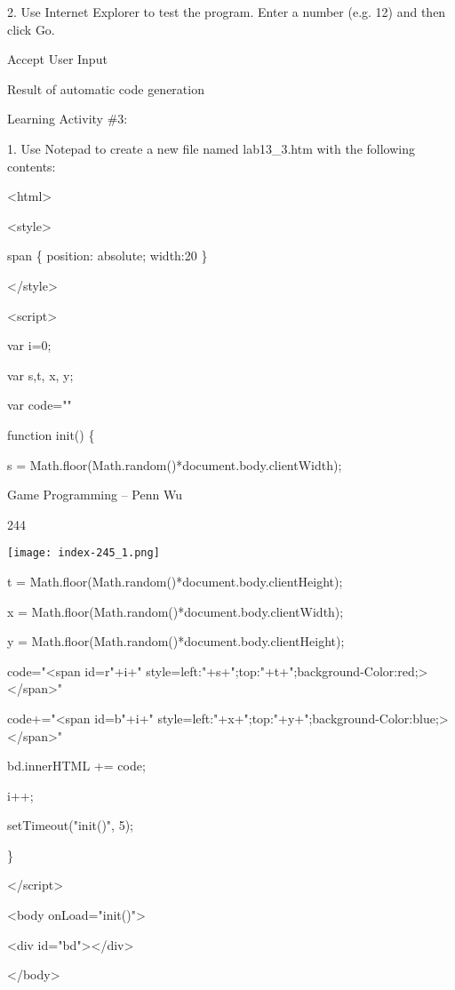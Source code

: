 \documentclass[
]{article}
\begin{document}
2. Use Internet Explorer to test the program. Enter a number (e.g. 12)
and then click Go.

Accept User Input

Result of automatic code generation

Learning Activity \#3:

1. Use Notepad to create a new file named lab13\_3.htm with the
following contents:

\textless html\textgreater{}

\textless style\textgreater{}

span \{ position: absolute; width:20 \}

\textless/style\textgreater{}

\textless script\textgreater{}

var i=0;

var s,t, x, y;

var code=""

function init() \{

s = Math.floor(Math.random()*document.body.clientWidth);

Game Programming -- Penn Wu

244

\protect\hypertarget{index_split_012.htmlux5cux23p245}{}{}\texttt{[image: index-245\_1.png]}

t = Math.floor(Math.random()*document.body.clientHeight);

x = Math.floor(Math.random()*document.body.clientWidth);

y = Math.floor(Math.random()*document.body.clientHeight);

code="\textless span id=r"+i+"
style=\textquotesingle left:"+s+";top:"+t+";background-Color:red;\textquotesingle\textgreater\textless/span\textgreater"

code+="\textless span id=b"+i+"
style=\textquotesingle left:"+x+";top:"+y+";background-Color:blue;\textquotesingle\textgreater\textless/span\textgreater"

bd.innerHTML += code;

i++;

setTimeout("init()", 5);

\}

\textless/script\textgreater{}

\textless body onLoad="init()"\textgreater{}

\textless div id="bd"\textgreater\textless/div\textgreater{}

\textless/body\textgreater{}
\end{document}
